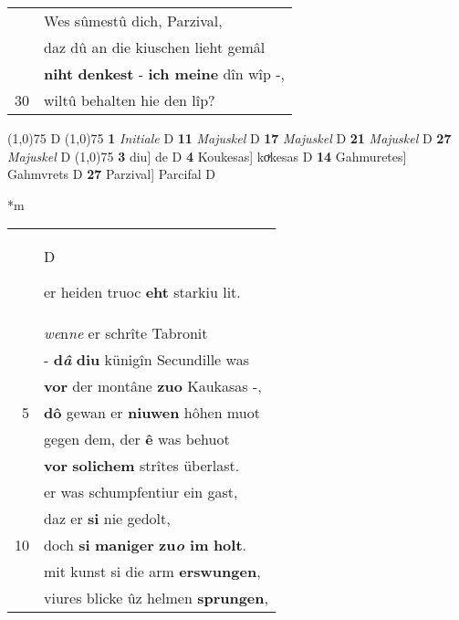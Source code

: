 \documentclass[8pt,a4paper,notitlepage]{article}
\begin{document}
\begin{table}[ht]
\begin{minipage}[t]{0.5\linewidth}
\begin{tabular}{rl}
 & Wes sûmestû dich, Parzival,\\ 
 & daz dû an die kiuschen lieht gemâl\\ 
 & \textbf{niht} \textbf{denkest} - \textbf{ich meine} dîn wîp -,\\ 
30 & wiltû behalten hie den lîp?\\ 
\end{tabular}
\scriptsize
\line(1,0){75} \newline
D \newline
\line(1,0){75} \newline
\textbf{1} \textit{Initiale} D  \textbf{11} \textit{Majuskel} D  \textbf{17} \textit{Majuskel} D  \textbf{21} \textit{Majuskel} D  \textbf{27} \textit{Majuskel} D  \newline
\line(1,0){75} \newline
\textbf{3} diu] de D \textbf{4} Koukesas] koͮkesas D \textbf{14} Gahmuretes] Gahmvrets D \textbf{27} Parzival] Parcifal D \newline
\end{minipage}
\hspace{0.5cm}
\begin{minipage}[t]{0.5\linewidth}
\small
\begin{center}*m
\end{center}
\begin{tabular}{rl}
 & \begin{large}D\end{large}er heiden truoc \textbf{eht} starkiu lit.\\ 
 & \textit{we}n\textit{ne} er schrîte Tabronit\\ 
 & - \textbf{d\textit{â}} \textbf{diu} künigîn Secundille was\\ 
 & \textbf{vor} der montâne \textbf{zuo} Kaukasas -,\\ 
5 & \textbf{dô} gewan er \textbf{niuwen} hôhen muot\\ 
 & gegen dem, der \textbf{ê} was behuot\\ 
 & \textbf{vor} \textbf{solichem} strîtes überlast.\\ 
 & er was schumpfentiur ein gast,\\ 
 & daz er \textbf{si} nie gedolt,\\ 
10 & doch \textbf{si} \textbf{maniger} \textbf{zu\textit{o} im} \textbf{holt}.\\ 
 & mit kunst si die arm \textbf{erswungen},\\ 
 & viures blicke ûz helmen \textbf{sprungen},\\ 

\end{tabular}
\end{minipage}
\end{table}
\end{document}
